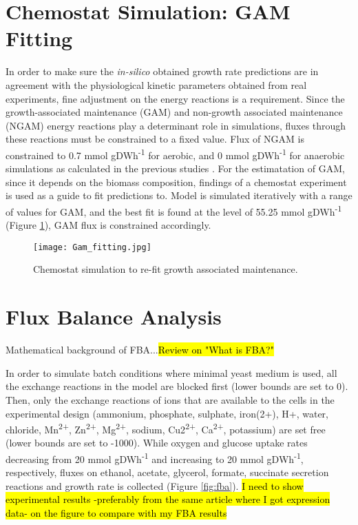 \section{Chemostat Simulation: GAM Fitting}
In order to make sure the \emph{in-silico} obtained growth rate predictions are in agreement with the physiological kinetic parameters obtained from real experiments, fine adjustment on the energy reactions is a requirement. Since the growth-associated maintenance (GAM) and non-growth associated maintenance (NGAM) energy reactions play a determinant role in simulations, fluxes through these reactions must be constrained to a fixed value. Flux of NGAM is constrained to 0.7 mmol gDWh\textsuperscript{-1} for aerobic, and 0 mmol gDWh\textsuperscript{-1} for anaerobic simulations as calculated in the previous studies \cite{nilsson2016metabolic}. For the estimatation of GAM, since it depends on the biomass composition, findings of a chemostat experiment \cite{van1998effect} is used as a guide to fit predictions to. Model is simulated iteratively with a range of values for GAM, and the best fit is found at the level of 55.25 mmol gDWh\textsuperscript{-1} (Figure \ref{fig:Gam_fitting}), GAM flux is constrained accordingly.

\begin{figure}
\begin{center}
\texttt{[image: Gam\_fitting.jpg]}
\end{center}
\caption[Chemostat simulation to re-fit growth associated maintenance]{Chemostat simulation to re-fit growth associated maintenance.}
\label{fig:Gam_fitting}
\end{figure}


\section{Flux Balance Analysis}
Mathematical background of FBA...\hl{Review on "What is FBA?"}

In order to simulate batch conditions where minimal yeast medium is used, all the exchange reactions in the model are blocked first (lower bounds are set to 0). Then, only the exchange reactions of ions that are available to the cells in the experimental design (ammonium, phosphate, sulphate, iron(2+), H+, water, chloride, Mn\textsuperscript{2+}, Zn\textsuperscript{2+}, Mg\textsuperscript{2+}, sodium, Cu2\textsuperscript{2+}, Ca\textsuperscript{2+}, potassium) are set free (lower bounds are set to -1000). While oxygen and glucose uptake rates decreasing from 20 mmol gDWh\textsuperscript{-1} and increasing to 20 mmol gDWh\textsuperscript{-1}, respectively, fluxes on ethanol, acetate, glycerol, formate, succinate secretion reactions and growth rate is collected (Figure \ref{fig:fba}).
\hl{I need to show experimental results -preferably from the same article where I got expression data- on the figure to compare with my FBA results}


